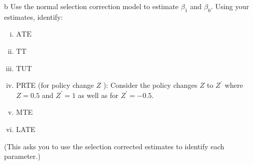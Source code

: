 \documentclass{article}
\begin{document}
\begin{problem}{b}
Use the normal selection correction model to estimate $\beta_{1}$ and $\beta_{0}$. Using your estimates, identify:
\begin{enumerate}[(i)]
    \item $\mathrm{ATE}$
    \item $\mathrm{TT}$
    \item TUT
    \item PRTE (for policy change $Z$ ): Consider the policy changes $Z$ to $Z^{\prime}$ where $Z=0.5$ and $Z^{\prime}=1$ as well as for $Z^{\prime}=-0.5$.
    \item MTE
    \item LATE
\end{enumerate}
(This asks you to use the selection corrected estimates to identify each parameter.)
\end{problem}
\end{document}
